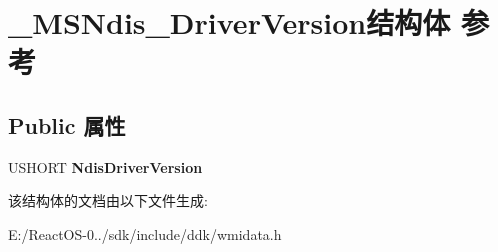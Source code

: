 \hypertarget{struct___m_s_ndis___driver_version}{}\section{\+\_\+\+M\+S\+Ndis\+\_\+\+Driver\+Version结构体 参考}
\label{struct___m_s_ndis___driver_version}
\subsection*{Public 属性}
\begin{DoxyCompactItemize}
\item 
\mbox{\label{struct___m_s_ndis___driver_version_a86d6c285848fc40e4627f1988af55ad1}} 
U\+S\+H\+O\+RT {\bfseries Ndis\+Driver\+Version}
\end{DoxyCompactItemize}


该结构体的文档由以下文件生成\+:\begin{DoxyCompactItemize}
\item 
E\+:/\+React\+O\+S-\/0../sdk/include/ddk/wmidata.\+h\end{DoxyCompactItemize}
